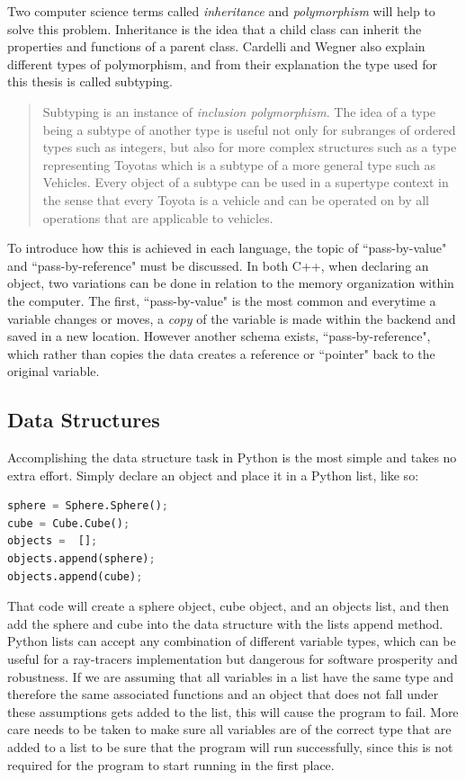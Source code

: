 Two computer science terms called \textit{inheritance} and \textit{polymorphism} will help to solve this problem.  Inheritance is the idea that a child class can inherit the properties and functions of a parent class.  Cardelli and Wegner also explain different types of polymorphism, and from their explanation the type used for this thesis is called subtyping.
\begin{quote}
Subtyping is an instance of \textit{inclusion polymorphism}. The idea of a type being a subtype of another type is useful not only for subranges of ordered types such as integers, but also for more complex structures
such as a type representing Toyotas which is a subtype of a more general type such as Vehicles. Every object of a subtype can be used in a supertype context in the sense that every Toyota is a vehicle and can be
operated on by all operations that are applicable to vehicles. \cite{cardelli1985understanding}
\end{quote}
To introduce how this is achieved in each language, the topic of ``pass-by-value" and ``pass-by-reference" must be discussed.  In both C++, when declaring an object, two variations can be done in relation to the memory organization within the computer.  The first, ``pass-by-value" is the most common and everytime a variable changes or moves, a \textit{copy} of the variable is made within the backend and saved in a new location.  However another schema exists, ``pass-by-reference", which rather than copies the data creates a reference or ``pointer" back to the original variable.
\subsection{Data Structures}
Accomplishing the data structure task in Python is the most simple and takes no extra effort.  Simply declare an object and place it in a Python list, like so:
\begin{lstlisting}[language=Python, caption=Python List Example, style=mystyle]
sphere = Sphere.Sphere();
cube = Cube.Cube();
objects =  [];
objects.append(sphere);
objects.append(cube);
\end{lstlisting}
That code will create a sphere object, cube object, and an objects list, and then add the sphere and cube into the data structure with the lists append method.  Python lists can accept any combination of different variable types, which can be useful for a ray-tracers implementation but dangerous for software prosperity and robustness.  If we are assuming that all variables in a list have the same type and therefore the same associated functions and an object that does not fall under these assumptions gets added to the list, this will cause the program to fail.  More care needs to be taken to make sure all variables are of the correct type that are added to a list to be sure that the program will run successfully, since this is not required for the program to start running in the first place.

